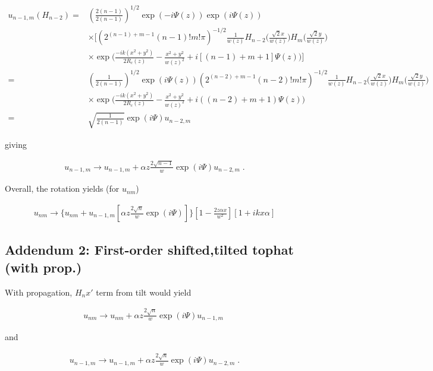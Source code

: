 \documentclass[aps,twoside,secnumarabic,balancelastpage,amsmath,amssymb,nofootinbib,hyperref=pdftex]{revtex4}
\begin{document}
\begin{align*}
	u_{n-1,m} (H_{n-2}) =&
	(\frac{2 (n-1) }{2 (n-1)})^{1/2}
			\exp(-i \Psi(z))\exp(i \Psi(z))
			\\& \times
	[
	(2^{(n-1)+m-1}(n-1)!m!\pi)^{-1/2}
		\frac{1}{w(z)}
		H_{n-2} \Big(\frac{\sqrt{2}x}{w(z)} \Big)
		H_{m} \Big(\frac{\sqrt{2}y}{w(z)} \Big)
	\\& \times		
		\exp \Big(\frac{-ik(x^{2}+y^{2})}{2R_{c}(z)}-
		\frac{x^{2}+y^{2}}{w(z)^{2}} 
		+i[(n-1)+m+1]\Psi(z)		
		\Big)
				]
		\\=&
		(\frac{1}{2 (n-1)}) ^{1/2}
		\exp(i \Psi(z))
			(2^{(n-2)+m-1}(n-2)!m!\pi)^{-1/2}
		\frac{1}{w(z)}
		H_{n-2} \Big(\frac{\sqrt{2}x}{w(z)} \Big)
		H_{m} \Big(\frac{\sqrt{2}y}{w(z)} \Big)
			\\& \times	
		\exp \Big(\frac{-ik(x^{2}+y^{2})}{2R_{c}(z)}-
		\frac{x^{2}+y^{2}}{w(z)^{2}} 
		+i( (n-2)+m+1)\Psi(z)			
		\Big)
		\\=&
		\sqrt{\frac{1}{2 (n-1)}}
		\exp(i \Psi)
		u_{n-2,m}
\end{align*}

giving

\begin{align*}
u_{n-1,m} \rightarrow
u_{n-1,m} + 
	\alpha z \frac{2 \sqrt{n-1}}{w} 
	\exp(i \Psi)
	u_{n-2,m} \; .
\end{align*}

Overall, the rotation yields (for $u_{nm}$)

\begin{align*}
	u_{nm} \rightarrow
		\{ u_{nm}+
	u_{n-1,m} [
		\alpha z \frac{2 \sqrt{n}}{w} 
	\exp(i \Psi)	]\} [1 - \frac{2z\alpha x}{w^2}][1+ikx\alpha ]	
\end{align*}

\clearpage

\subsection{Addendum 2: First-order shifted,tilted tophat (with prop.)}

With propagation, $H_n{x'}$ term from tilt would yield

\begin{align*}
u_{nm} \rightarrow
u_{nm} + 
	\alpha z \frac{2 \sqrt{n}}{w} 
	\exp(i \Psi)
	u_{n-1,m} \; 
\end{align*}

and

\begin{align*}
u_{n-1,m} \rightarrow
u_{n-1,m} + 
	\alpha z \frac{2 \sqrt{n}}{w} 
	\exp(i \Psi)
	u_{n-2,m} \; .
\end{align*}
\end{document}
